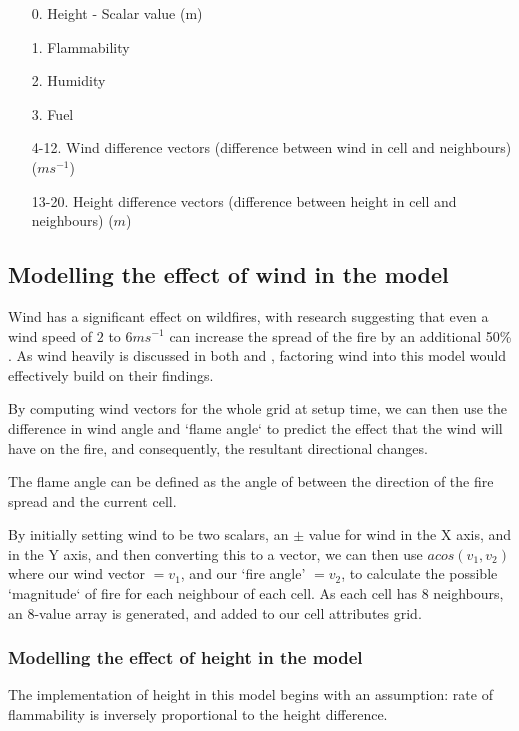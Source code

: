 \documentclass[11pt, a4paper, titlepage]{article}
\begin{document}
\begin{itemize}
  \item [0.] Height - Scalar value (m)
  \item [1.] Flammability
  \item [2.] Humidity
  \item [3.] Fuel
  \item [4-12.] Wind difference vectors (difference between wind in cell and neighbours) ($ms^{-1}$)
  \item [13-20.] Height difference vectors (difference between height in cell and neighbours) ($m$)
\end{itemize}

\subsection{Modelling the effect of wind in the model}
Wind has a significant effect on wildfires, with research suggesting that even a wind speed of $2$ to $6ms^{-1}$ can increase the spread of the fire by an additional 50\% \cite{Beer1991}. As wind heavily is discussed in both \cite{ALEXANDRIDIS2008191} and \cite{HERNANDEZENCINAS20071213}, factoring wind into this model would effectively build on their findings.

By computing wind vectors for the whole grid at setup time, we can then use the difference in wind angle and `flame angle` to predict the effect that the wind will have on the fire, and consequently, the resultant directional changes.

The flame angle can be defined as the angle of between the direction of the fire spread and the current cell.

By initially setting wind to be two scalars, an  $\pm$ value for wind in the X axis, and in the Y axis, and then converting this to a vector, we can then use $acos(v_1,v_2)$ where our wind vector $= v_1$, and our `fire angle' $= v_2$, to calculate the possible `magnitude` of fire for each neighbour of each cell. As each cell has 8 neighbours, an 8-value array is generated, and added to our cell attributes grid.

\subsubsection{Modelling the effect of height in the model}
The implementation of height in this model begins with an assumption: rate of flammability is inversely proportional to the height difference.
\end{document}
